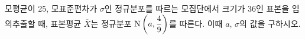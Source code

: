 모평균이 25, 모표준편차가 $\sigma$인 정규분포를 따르는 모집단에서 크기가 36인 표본을 임의추출할 때, 표본평균 $\overline{X}$는 정규분포 $\mathrm{N}\left(a{,}\mkern3mu\mathopen{}\dfrac{4}{9}\right)$를 따른다. 이때 $a$, $\sigma$의 값을 구하시오.
